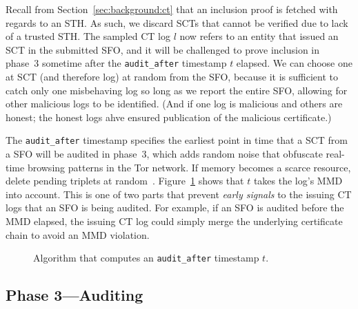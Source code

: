 Recall from Section~\ref{sec:background:ct} that an inclusion proof is fetched
with regards to an STH.  As such, we discard SCTs that cannot be verified due to
lack of a trusted STH.  The sampled CT log $l$ now refers to an entity that issued an
SCT in the submitted SFO, and it will be challenged to prove inclusion in phase~3
sometime after the \texttt{audit\_after} timestamp $t$ elapsed. We can choose one
at SCT (and therefore log) at random from the SFO, because it is sufficient to catch
only one misbehaving log so long as we report the entire SFO, allowing for other
malicious logs to be identified. (And if one log is malicious and others are honest; the
honest logs ahve ensured publication of the malicious certificate.)

The \texttt{audit\_after} timestamp specifies the earliest point in time that a SCT
from a SFO will be audited in phase~3, which adds random noise that obfuscate
real-time browsing patterns in the Tor network.  If memory becomes a scarce
resource, delete pending triplets at random~\cite{nordberg}. Figure~\ref{fig:audit-after}
shows that $t$ takes the log's MMD into account.  This is one of two parts that prevent
\emph{early signals} to the issuing CT logs that an SFO is being audited.  For example,
if an SFO is audited before the MMD elapsed, the issuing CT log could simply merge
the underlying certificate chain to avoid an MMD violation.


\begin{figure}
	\centering
	\caption{%
		Algorithm that computes an \texttt{audit\_after} timestamp $t$.
	}
	\label{fig:audit-after}
\end{figure}

\subsection{Phase 3---Auditing} \label{sec:base:phase3}

